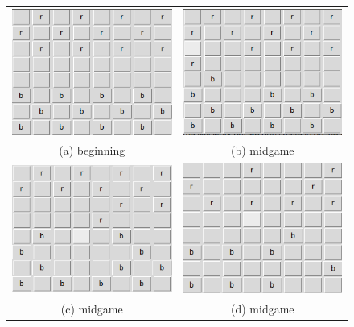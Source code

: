 \documentclass{article}
\begin{document}
\begin{figure}
\begin{tabular}{cc}
  \includegraphics[width=65mm]{images/game-start.png} &   \includegraphics[width=65mm]{images/game-1.png} \\
(a) beginning & (b) midgame \\[6pt]
 \includegraphics[width=65mm]{images/game-2.png} &   \includegraphics[width=65mm]{images/game-3.png} \\
(c) midgame & (d) midgame \\[6pt]

\end{tabular}
\end{figure}
\end{document}

